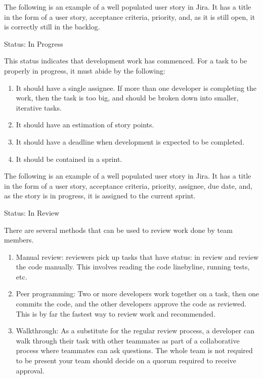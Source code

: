 \documentclass[letterpaper,10pt,english]{jupyterBook}
\begin{document}
\sphinxAtStartPar
The following is an example of a well populated user story in Jira. It
has a title in the form of a user story, acceptance criteria, priority,
and, as it is still open, it is correctly still in the backlog.

\sphinxAtStartPar
{}

\sphinxAtStartPar
Status: In Progress

\sphinxAtStartPar
This status indicates that development work has commenced. For a task to
be properly in progress, it must abide by the following:
\begin{enumerate}
%
\item {} 
\sphinxAtStartPar
It should have a single assignee. If more than one developer is
completing the work, then the task is too big, and should be broken
down into smaller, iterative tasks.

\item {} 
\sphinxAtStartPar
It should have an estimation of story points.

\item {} 
\sphinxAtStartPar
It should have a deadline when development is expected to be
completed.

\item {} 
\sphinxAtStartPar
It should be contained in a sprint.

\end{enumerate}

\sphinxAtStartPar
The following is an example of a well populated user story in Jira. It
has a title in the form of a user story, acceptance criteria, priority,
assignee, due date, and, as the story is in progress, it is assigned to
the current sprint.

\sphinxAtStartPar
{}

\sphinxAtStartPar
Status: In Review

\sphinxAtStartPar
There are several methods that can be used to review work done
by team members.
\begin{enumerate}
%
\item {} 
\sphinxAtStartPar
Manual review: reviewers pick up tasks that have status: in review
and review the code manually. This involves reading the code
line\sphinxhyphen{}by\sphinxhyphen{}line, running tests, etc.

\item {} 
\sphinxAtStartPar
Peer programming: Two or more developers work together on a task,
then one commits the code, and the other developers approve the code
as reviewed. This is by far the fastest way to review work and
recommended.

\item {} 
\sphinxAtStartPar
Walkthrough: As a substitute for the regular review process, a
developer can walk through their task with other teammates as part
of a collaborative process where teammates can ask questions. The
whole team is not required to be present \sphinxhyphen{} your team should decide
on a quorum required to receive approval.

\end{enumerate}
\end{document}
